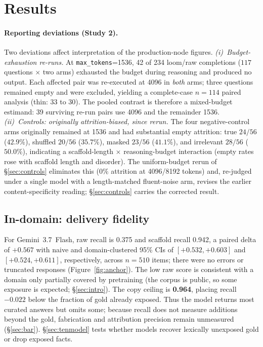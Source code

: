 \documentclass[10pt,twocolumn]{article}
\begin{document}
\section{Results}\label{sec:results}
\paragraph{Reporting deviations (Study 2).} Two deviations affect interpretation of the production-node figures. \emph{(i)~Budget-exhaustion re-runs.} At \texttt{max\_tokens}=1536, 42 of 234 loom/raw completions ($117$ questions $\times$ two arms) exhausted the budget during reasoning and produced no output. Each affected pair was re-executed at 4096 in \emph{both} arms; three questions remained empty and were excluded, yielding a complete-case $n=114$ paired analysis (thin: 33 to 30). The pooled contrast is therefore a mixed-budget estimand: 39 surviving re-run pairs use 4096 and the remainder 1536. \emph{(ii)~Controls: originally attrition-biased, since rerun.} The four negative-control arms originally remained at 1536 and had substantial empty attrition: true $24/56$ ($42.9\%$), shuffled $20/56$ ($35.7\%$), masked $23/56$ ($41.1\%$), and irrelevant $28/56$ ($50.0\%$), indicating a scaffold-length $\times$ reasoning-budget interaction (empty rates rose with scaffold length and disorder). The uniform-budget rerun of \S\ref{sec:controls} eliminates this ($0\%$ attrition at 4096/8192 tokens) and, re-judged under a single model with a length-matched fluent-noise arm, revises the earlier content-specificity reading; \S\ref{sec:controls} carries the corrected result.

\subsection{In-domain: delivery fidelity}\label{sec:indomain}
For Gemini~3.7~Flash, raw recall is 0.375 and scaffold recall 0.942, a paired delta of $\mathbf{+0.567}$ with naive and domain-clustered 95\% CIs of $[+0.532,+0.603]$ and $[+0.524,+0.611]$, respectively, across $n=510$ items; there were no errors or truncated responses (Figure~\ref{fig:anchor}). The low raw score is consistent with a domain only partially covered by pretraining (the corpus is public, so some exposure is expected; \S\ref{sec:intro}). The copy ceiling is \textbf{0.964}, placing recall $-0.022$ below the fraction of gold already exposed. Thus the model returns most curated answers but omits some; because recall does not measure additions beyond the gold, fabrication and attribution precision remain unmeasured (\S\ref{sec:bar}). \S\ref{sec:tenmodel} tests whether models recover lexically unexposed gold or drop exposed facts.
\end{document}
